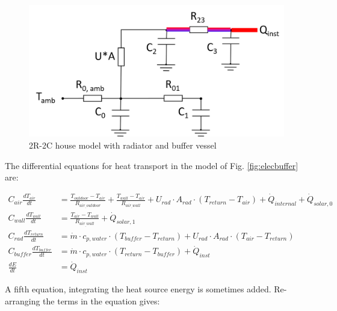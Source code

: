 \begin{figure}[H]
	\centering
	\includegraphics[width=0.7\columnwidth]{Pictures/buffervessel.png}
	\caption[Short title]{2R-2C house model with radiator and buffer vessel}
	\label{fig:buffervessel}
\end{figure} 

The differential equations for heat transport in the model of Fig. \ref{fig:elecbuffer} are:

\begin{equation}
	\begin{aligned}
	    C_{air} \frac{dT_{air}}{dt} &= \frac{T_{outdoor}-T_{air}}{R_{air_{\_}outdoor}} + \frac{T_{wall}-T_{air}}{R_{air_{\_}wall}} + U_{rad} \cdot A_{rad} \cdot (T_{return} - T_{air}) + \dot{Q}_{internal} + \dot{Q}_{solar, 0} \\
	    C_{wall} \frac{dT_{wall}}{dt} &= \frac{T_{air}-T_{wall}}{R_{air_{\_}wall}} + \dot{Q}_{solar, 1} \\
	    C_{rad} \frac{dT_{return}}{dt} &= \dot{m} \cdot c_{p, water} \cdot (T_{buffer} - T_{return}) + U_{rad} \cdot A_{rad} \cdot (T_{air} - T_{return}) \\
		C_{buffer} \frac{dT_{buffer}}{dt} &= \dot{m} \cdot c_{p, water} \cdot ( T_{return} - T_{buffer} ) + \dot{Q}_{inst} \\
	    \frac{dE}{dt} &= \dot{Q}_{inst}
	\end{aligned}
\end{equation}

 A fifth equation, integrating the heat source energy is sometimes added. Re-arranging the terms in the equation gives:
 

